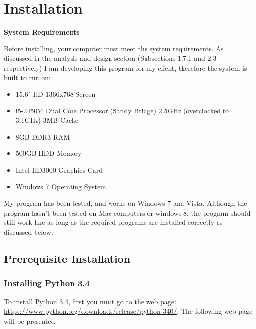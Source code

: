 \section{Installation}

\textbf{System Requirements}

Before installing, your computer must meet the system requirements. As discussed in the analysis and design section (Subsections 1.7.1  and 2.3 respectively) I am developing this program for my client, therefore the system is built to run on:

\begin{itemize}
    \item 15.6" HD 1366x768 Screen
    \item i5-2450M Dual Core Processor (Sandy Bridge) 2.5GHz (overclocked to 3.1GHz) 3MB Cache
    \item 8GB DDR3 RAM
    \item 500GB HDD Memory
    \item Intel HD3000 Graphics Card
    \item Windows 7 Operating System
\end{itemize}

My program has been tested, and works on Windows 7 and Vista. Although the program hasn't been tested on Mac computers or windows 8, the program should still work fine as long as the required programs are installed correctly as discussed below.




\subsection{Prerequisite Installation}


\subsubsection{Installing Python 3.4}

To install Python 3.4, first you must go to the web page: \url{https://www.python.org/downloads/release/python-340/}. The following web page will be presented.

